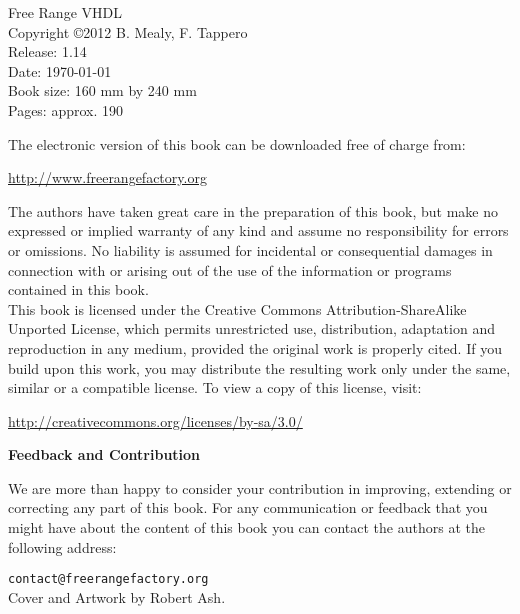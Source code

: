 %
%
\setcounter{page}{1}

{\footnotesize
\noindent
Free Range VHDL\\
Copyright \copyright 2012 B. Mealy, F. Tappero\\
Release: 1.14\\
Date: \today\\
Book size: 160 mm by 240 mm\\
Pages: approx. 190\\
\vspace{20pt}

\noindent
The electronic version of this book can be downloaded free of charge from:

\noindent
\url{http://www.freerangefactory.org}

\vspace{15pt}

\noindent
The authors have taken great care in the preparation of this book, but make no expressed or implied warranty of any kind and assume no responsibility for errors or omissions. No liability is assumed for incidental or consequential damages in connection with or arising out of the use of the information or programs contained in this book.\\

\noindent
This book is licensed under the Creative Commons Attribution-ShareAlike Unported License, which permits unrestricted use, distribution, adaptation and reproduction in any medium, provided the original work is properly cited. If you build upon this work, you may distribute the resulting work only under the same, similar or a compatible license. To view a copy of this license, visit:

\noindent
\url{http://creativecommons.org/licenses/by-sa/3.0/}
\vspace{25pt}

\noindent
{\sffamily\bfseries Feedback and Contribution}

\noindent
We are more than happy to consider your contribution in improving, extending or correcting any part of this book.
For any communication or feedback that you might have about the content of this book you can contact the authors at the following address:

\noindent
\texttt{contact@freerangefactory.org}\\

\vfill
\noindent
Cover and Artwork by Robert Ash.

} %
